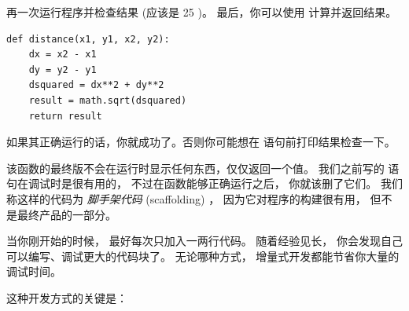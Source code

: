 %

再一次运行程序并检查结果 (应该是 25 )。
最后，你可以使用  计算并返回结果。
  

\begin{lstlisting}
def distance(x1, y1, x2, y2):
    dx = x2 - x1
    dy = y2 - y1
    dsquared = dx**2 + dy**2
    result = math.sqrt(dsquared)
    return result
\end{lstlisting}

%

如果其正确运行的话，你就成功了。否则你可能想在  语句前打印结果检查一下。


该函数的最终版不会在运行时显示任何东西，仅仅返回一个值。
我们之前写的  语句在调试时是很有用的， 不过在函数能够正确运行之后， 你就该删了它们。
我们称这样的代码为 {\em 脚手架代码} (scaffolding) ， 因为它对程序的构建很有用， 但不是最终产品的一部分。


当你刚开始的时候， 最好每次只加入一两行代码。
随着经验见长， 你会发现自己可以编写、调试更大的代码块了。
无论哪种方式， 增量式开发都能节省你大量的调试时间。


这种开发方式的关键是：



